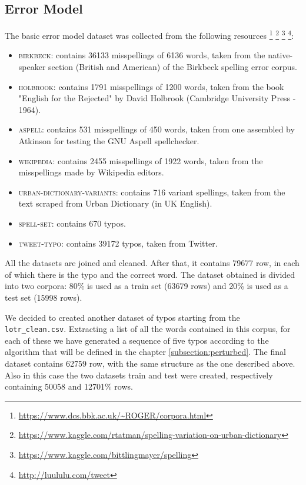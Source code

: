 \subsection{Error Model}
The basic error model dataset was collected from the following resources 
\footnote{\url{https://www.dcs.bbk.ac.uk/~ROGER/corpora.html}}  
\footnote{\url{https://www.kaggle.com/rtatman/spelling-variation-on-urban-dictionary}}  
\footnote{\url{https://www.kaggle.com/bittlingmayer/spelling}}
\footnote{\url{http://luululu.com/tweet}}:
\begin{itemize}
	\item \textsc{birkbeck}: contains \num{36133} misspellings of \num{6136} words, taken from the native-speaker 
	section (British and American) of the Birkbeck spelling error corpus.
	\item \textsc{holbrook}: contains \num{1791} misspellings of \num{1200} words, taken from the book "English for the 
	Rejected" by 
	David Holbrook (Cambridge University Press - 1964).
	\item \textsc{aspell}: contains \num{531} misspellings of \num{450} words, taken from one assembled by Atkinson for 
	testing the 
	GNU Aspell spellchecker.
	\item \textsc{wikipedia}: contains \num{2455} misspellings of \num{1922} words, taken from the misspellings made by 
	Wikipedia 
	editors.
	\item \textsc{urban-dictionary-variants}: contains \num{716} variant spellings, taken from the text scraped from Urban 
	Dictionary (in UK English).
	\item \textsc{spell-set}: contains \num{670} typos.
	\item \textsc{tweet-typo}: contains \num{39172} typos, taken from Twitter.
\end{itemize}

All the datasets are joined and cleaned. After that, it contains \num{79677} row, in each of which there 
is the typo and the correct word.
The dataset obtained is divided into two corpora: \num{80}\% is used as a train set (\num{63679} rows) and \num{20}\% 
is used as a test set (\num{15998} rows).


We decided to created another dataset of typos starting from the \\\texttt{lotr\_clean.csv}. 
Extracting a list of all the words contained in this corpus, for each of these we have generated a sequence of five typos 
according to the algorithm that will be defined in the chapter \ref{subsection:perturbed}.
The final dataset contains \num{62759} row, with the same structure as the one described above.
Also in this case the two datasets train and test were created, respectively containing \num{50058} and \num{12701}\% 
rows.



